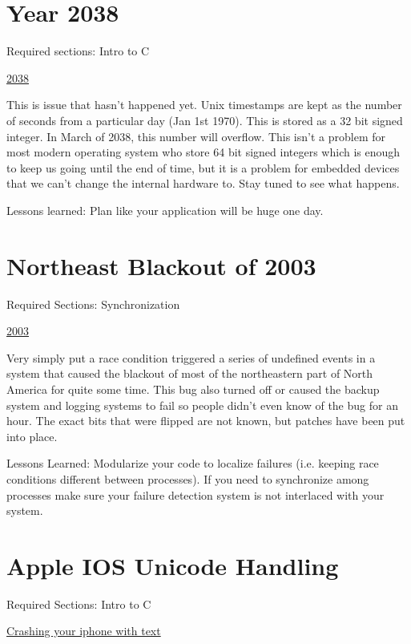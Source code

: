 \section{Year 2038}

Required sections: Intro to C

\href{https://en.wikipedia.org/wiki/Year_2038_problem}{2038}

This is issue that hasn't happened yet.
Unix timestamps are kept as the number of seconds from a particular day (Jan 1st 1970).
This is stored as a 32 bit signed integer.
In March of 2038, this number will overflow.
This isn't a problem for most modern operating system who store 64 bit signed integers which is enough to keep us going until the end of time, but it is a problem for embedded devices that we can't change the internal hardware to.
Stay tuned to see what happens.

Lessons learned: Plan like your application will be huge one day.

\section{Northeast Blackout of 2003}

Required Sections: Synchronization

\href{https://en.wikipedia.org/wiki/Northeast_blackout_of_2003}{2003}

Very simply put a race condition triggered a series of undefined events in a system that caused the blackout of most of the northeastern part of North America for quite some time.
This bug also turned off or caused the backup system and logging systems to fail so people didn't even know of the bug for an hour. The exact bits that were flipped are not known, but patches have been put into place.

Lessons Learned: Modularize your code to localize failures (i.e. keeping race conditions different between processes). If you need to synchronize among processes make sure your failure detection system is not interlaced with your system.


\section{Apple IOS Unicode Handling}

Required Sections: Intro to C

\href{http://appleinsider.com/articles/15/05/26/bug-in-ios-notifications-handling-crashes-iphones-with-a-simple-text}{Crashing your iphone with text}

